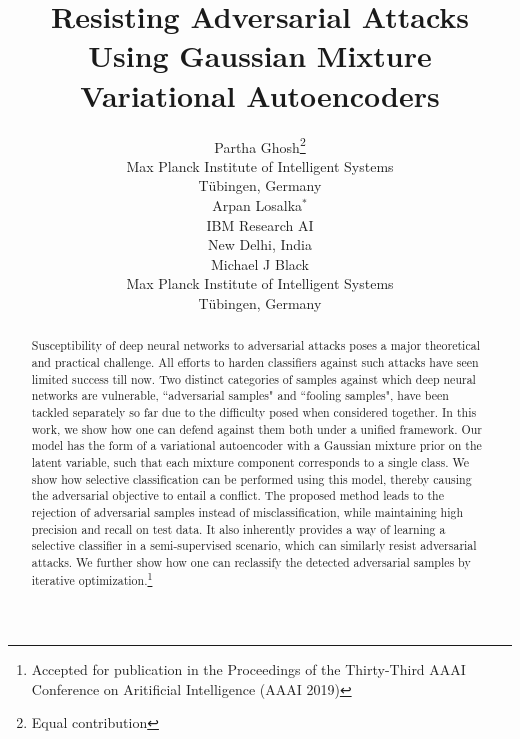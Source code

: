 \documentclass[letterpaper]{article} %
\begin{document}
\title{Resisting Adversarial Attacks Using Gaussian Mixture Variational Autoencoders}
\author{  Partha Ghosh\thanks{Equal contribution} \\
  Max Planck Institute of Intelligent Systems\\
  T\"{u}bingen, Germany\\
  \And
  Arpan Losalka$^*$\\
  IBM Research AI\\
  New Delhi, India \\
  \And
  Michael J Black \\
  Max Planck Institute of Intelligent Systems\\
  T\"{u}bingen, Germany\\
}
\maketitle
\begin{abstract}
Susceptibility of deep neural networks to adversarial attacks poses a major theoretical and practical challenge. All efforts to harden classifiers against such attacks have seen limited success till now. Two distinct categories of samples against which deep neural networks are vulnerable, ``adversarial samples" and ``fooling samples", have been tackled separately so far due to the difficulty posed when considered together. In this work, we show how one can defend against them both under a unified framework. Our model has the form of a variational autoencoder with a Gaussian mixture prior on the latent variable, such that each mixture component corresponds to a single class. We show how selective classification can be performed using this model, thereby causing the adversarial objective to entail a conflict. The proposed method leads to the rejection of adversarial samples instead of misclassification, while maintaining high precision and recall on test data. It also inherently provides a way of learning a selective classifier in a semi-supervised scenario, which can similarly resist adversarial attacks. We further show how one can reclassify the detected adversarial samples by iterative optimization.\footnote{Accepted for publication in the Proceedings of the Thirty-Third AAAI Conference on Aritificial Intelligence (AAAI 2019)}
\end{abstract}
\end{document}
